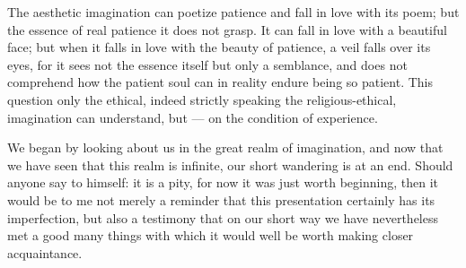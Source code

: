 \documentclass[12pt,a4paper,openany]{book}
\begin{document}
The aesthetic imagination can poetize patience and fall in love with its poem; but the essence of real patience it does not grasp. It can fall in love with a beautiful face; but when it falls in love with the beauty of patience, a veil falls over its eyes, for it sees not the essence itself but only a semblance, and does not comprehend how the patient soul can in reality endure being so patient. This question only the ethical, indeed strictly speaking the religious-ethical, imagination can understand, but --- on the condition of experience.

We began by looking about us in the great realm of imagination, and now that we have seen that this realm is infinite, our short wandering is at an end. Should anyone say to himself: it is a pity, for now it was just worth beginning, then it would be to me not merely a reminder that this presentation certainly has its imperfection, but also a testimony that on our short way we have nevertheless met a good many things with which it would well be worth making closer acquaintance.
\end{document}
